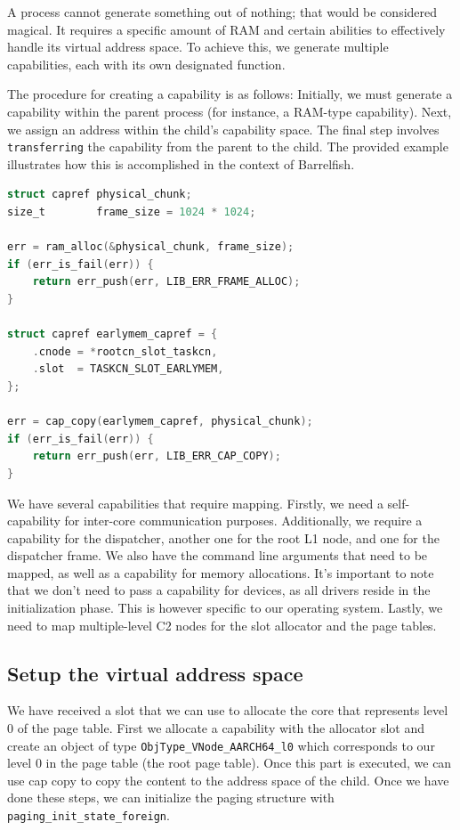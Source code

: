 A process cannot generate something out of nothing; that would be considered magical. It requires a specific amount of RAM and certain abilities to effectively handle its virtual address space. To achieve this, we generate multiple capabilities, each with its own designated function.

The procedure for creating a capability is as follows: Initially, we must generate a capability within the parent process (for instance, a RAM-type capability). Next, we assign an address within the child's capability space. The final step involves \texttt{transferring} the capability from the parent to the child. The provided example illustrates how this is accomplished in the context of Barrelfish.


\begin{lstlisting}[caption={Typical process of creation and mapping of capability},language=C,frame=single,breaklines]
struct capref physical_chunk;
size_t        frame_size = 1024 * 1024;

err = ram_alloc(&physical_chunk, frame_size);
if (err_is_fail(err)) {
    return err_push(err, LIB_ERR_FRAME_ALLOC);
}

struct capref earlymem_capref = {
    .cnode = *rootcn_slot_taskcn,
    .slot  = TASKCN_SLOT_EARLYMEM,
};

err = cap_copy(earlymem_capref, physical_chunk);
if (err_is_fail(err)) {
    return err_push(err, LIB_ERR_CAP_COPY);
}
\end{lstlisting}

We have several capabilities that require mapping. Firstly, we need a self-capability for inter-core communication purposes. Additionally, we require a capability for the dispatcher, another one for the root L1 node, and one for the dispatcher frame. We also have the command line arguments that need to be mapped, as well as a capability for memory allocations. It's important to note that we don't need to pass a capability for devices, as all drivers reside in the initialization phase. This is however specific to our operating system. Lastly, we need to map multiple-level C2 nodes for the slot allocator and the page tables.
\subsection{Setup the virtual address space}

We have received a slot that we can use to allocate the core that represents level 0 of the page table. First we allocate a capability with the allocator slot and create an object of type \texttt{ObjType\_VNode\_AARCH64\_l0} which corresponds to our level 0 in the page table (the root page table). Once this part is executed, we can use cap copy to copy the content to the address space of the child. Once we have done these steps, we can initialize the paging structure with \texttt{paging\_init\_state\_foreign}. 

